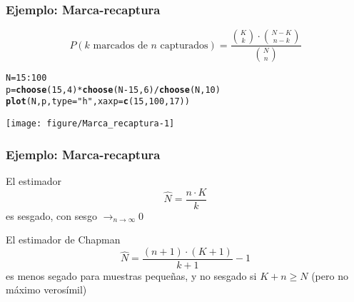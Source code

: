 \documentclass[12pt,t]{beamer}\usepackage[]{graphicx}\usepackage[]{color}
\makeatletter
\def\maxwidth{ %
  \ifdim\Gin@nat@width>\linewidth
    \linewidth
  \else
    \Gin@nat@width
  \fi
}
\newcommand{\hlnum}[1]{\textcolor[rgb]{0.686,0.059,0.569}{#1}}%
\newcommand{\hlstr}[1]{\textcolor[rgb]{0.192,0.494,0.8}{#1}}%
\newcommand{\hlopt}[1]{\textcolor[rgb]{0,0,0}{#1}}%
\newcommand{\hlstd}[1]{\textcolor[rgb]{0.345,0.345,0.345}{#1}}%
\newcommand{\hlkwb}[1]{\textcolor[rgb]{0.69,0.353,0.396}{#1}}%
\newcommand{\hlkwc}[1]{\textcolor[rgb]{0.333,0.667,0.333}{#1}}%
\newcommand{\hlkwd}[1]{\textcolor[rgb]{0.737,0.353,0.396}{\textbf{#1}}}%
\newenvironment{kframe}{%
 \def\at@end@of@kframe{}%
 \ifinner\ifhmode%
  \def\at@end@of@kframe{\end{minipage}}%
  \begin{minipage}{\columnwidth}%
 \fi\fi%
 \def\FrameCommand##1{\hskip\@totalleftmargin \hskip-\fboxsep
 \colorbox{shadecolor}{##1}\hskip-\fboxsep
     \hskip-\linewidth \hskip-\@totalleftmargin \hskip\columnwidth}%
 \MakeFramed {\advance\hsize-\width
   \@totalleftmargin\z@ \linewidth\hsize
   \@setminipage}}%
 {\par\unskip\endMakeFramed%
 \at@end@of@kframe}
\newenvironment{knitrout}{}{} %
\renewcommand{\emph}[1]{{\color{red}#1}}
\renewcommand{\geq}{\geqslant}
\def\tendeix{{\displaystyle\mathop{\longrightarrow}_{\scriptscriptstyle
n\to\infty}}}
\theoremstyle{plain}
\theoremstyle{definition}
\makeatother
\begin{document}
\begin{frame}[fragile]
\frametitle{Ejemplo: Marca-recaptura}
\vspace*{-0.8cm}

$$
P(\mbox{$k$ marcados de $n$ capturados})=\dfrac{\binom{K}{k}\cdot \binom{N-K}{n-k}}{\binom{N}{n}}
$$

\begin{knitrout}\tiny
{}\color{fgcolor}\begin{kframe}
\begin{alltt}
\hlstd{N}\hlkwb{=}\hlnum{15}\hlopt{:}\hlnum{100}
\hlstd{p}\hlkwb{=}\hlkwd{choose}\hlstd{(}\hlnum{15}\hlstd{,}\hlnum{4}\hlstd{)}\hlopt{*}\hlkwd{choose}\hlstd{(N}\hlopt{-}\hlnum{15}\hlstd{,}\hlnum{6}\hlstd{)}\hlopt{/}\hlkwd{choose}\hlstd{(N,}\hlnum{10}\hlstd{)}
\hlkwd{plot}\hlstd{(N,p,}\hlkwc{type}\hlstd{=}\hlstr{"h"}\hlstd{,}\hlkwc{xaxp}\hlstd{=}\hlkwd{c}\hlstd{(}\hlnum{15}\hlstd{,}\hlnum{100}\hlstd{,}\hlnum{17}\hlstd{))}
\end{alltt}
\end{kframe}
\texttt{[image: figure/Marca\_recaptura-1]} 

\end{knitrout}



\end{frame}


\begin{frame}
\frametitle{Ejemplo: Marca-recaptura}

El estimador
$$
\widehat{N}=\frac{n\cdot K}{k}
$$
es sesgado, con sesgo $\tendeix 0$
\bigskip

El \emph{estimador de Chapman}
$$
\widehat{N}=\frac{(n+1)\cdot (K+1)}{k+1}-1
$$
es menos segado para  muestras pequeñas, y no sesgado si $K+n\geq N$ (pero no máximo verosímil)
\end{frame}
\end{document}
